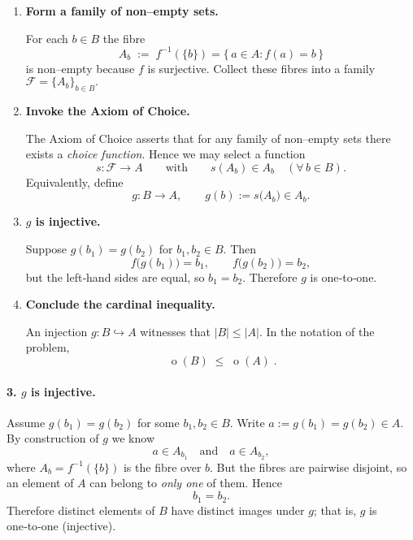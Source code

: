 \documentclass[12pt]{article}
\theoremstyle{definition} %
\theoremstyle{plain} %
\begin{document}
\begin{enumerate}
\item \textbf{Form a family of non–empty sets.}

      For each $b\in B$ the fibre
      \[
          A_{b}\;:=\;f^{-1}(\{b\})
          =\{\,a\in A : f(a)=b\,\}
      \]
      is non–empty because $f$ is surjective.  
      Collect these fibres into a family
      \(
          \mathcal{F}=\{A_{b}\}_{b\in B}.
      \)

\item \textbf{Invoke the Axiom of Choice.}

      The Axiom of Choice asserts that for any family of non–empty sets
      there exists a \emph{choice function}.  
      Hence we may select a function
      \[
          s:\mathcal{F}\longrightarrow A
          \qquad\text{with}\qquad
          s(A_{b})\in A_{b}\quad(\forall\,b\in B).
      \]
      Equivalently, define
      \[
          g:B\longrightarrow A,
          \qquad
          g(b):=s\bigl(A_{b}\bigr)\in A_{b}.
      \]

\item \textbf{$g$ is injective.}

      Suppose $g(b_{1})=g(b_{2})$ for $b_{1},b_{2}\in B$.  
      Then
      \[
          f\!\bigl(g(b_{1})\bigr)
          =b_{1},
          \qquad
          f\!\bigl(g(b_{2})\bigr)
          =b_{2},
      \]
      but the left‑hand sides are equal, so $b_{1}=b_{2}$.  
      Therefore $g$ is one‑to‑one.

\item \textbf{Conclude the cardinal inequality.}

      An injection $g:B\hookrightarrow A$ witnesses that
      \(
          |B|\le |A|.
      \)
      In the notation of the problem,
      \[
          \boxed{\;
            \operatorname{o}(B)\;\le\;\operatorname{o}(A)
          \;} .
      \]
      \qedhere
\end{enumerate}
\paragraph{3.\; $g$ is injective.}

Assume $g(b_{1})=g(b_{2})$ for some $b_{1},b_{2}\in B$.  
Write $a:=g(b_{1})=g(b_{2})\in A$.  
By construction of $g$ we know
\[
    a \in A_{b_{1}}
    \quad\text{and}\quad
    a \in A_{b_{2}},
\]
where $A_{b}=f^{-1}(\{b\})$ is the fibre over $b$.  
But the fibres are pairwise disjoint, so an element of $A$ can belong to
\emph{only one} of them.  Hence
\[
    b_{1}=b_{2}.
\]
Therefore distinct elements of $B$ have distinct images under $g$; that
is, $g$ is one‑to‑one (injective).
\end{document}
